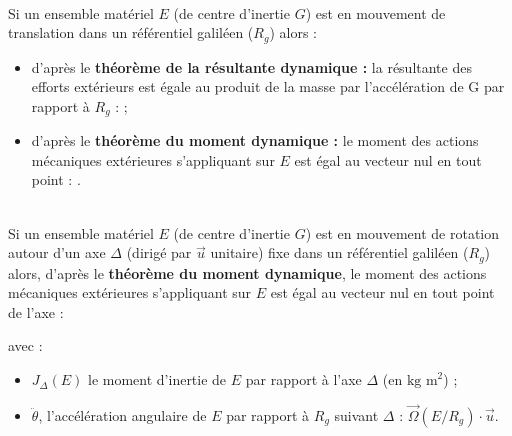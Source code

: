 \documentclass[10pt,fleqn]{article} %
\begin{document}
\begin{definition} ~\\
Si un ensemble matériel $E$ (de centre d'inertie $G$) est en mouvement de translation dans un référentiel galiléen ($R_g$) alors : 

\begin{itemize}
\item d'après le \textbf{théorème de la résultante dynamique : } la résultante des efforts extérieurs est égale au produit de la masse par l'accélération de G par rapport à $R_g$ :
;%
\item d'après le \textbf{théorème du moment dynamique : } le moment des actions mécaniques extérieures s'appliquant sur $E$ est égal au vecteur nul en tout point :
.
\end{itemize}

\end{definition}
 



\begin{definition} ~\\
Si un ensemble matériel $E$ (de centre d'inertie $G$) est en mouvement de rotation autour d'un axe $\Delta$ (dirigé par $\overrightarrow{u}$ unitaire) fixe dans un référentiel galiléen ($R_g$) alors, d'après le \textbf{théorème du moment dynamique}, le moment des actions mécaniques extérieures s'appliquant sur $E$ est égal au vecteur nul en tout point de l'axe :

 avec :
\begin{itemize}
\item  $J_{\Delta}(E)$ le moment d'inertie de $E$ par rapport à l'axe $\Delta$ (en $\text{kg  m}^2$) ;
\item $\ddot{\theta}$, l'accélération angulaire de $E$ par rapport à $R_g$ suivant $\Delta$ : $\overrightarrow{\Omega}(E/R_g)\cdot \overrightarrow{u}$.
\end{itemize}
\end{definition}
\end{document}
